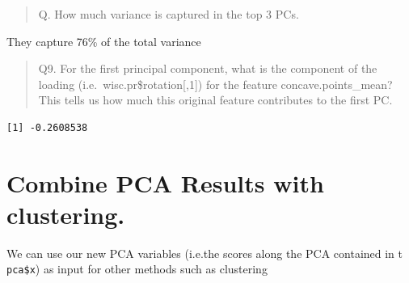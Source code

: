 \documentclass[
  letterpaper,
  DIV=11,
  numbers=noendperiod]{scrartcl}
\newenvironment{Shaded}{\begin{snugshade}}{\end{snugshade}}
\newcommand{\AttributeTok}[1]{\textcolor[rgb]{0.40,0.45,0.13}{#1}}
\newcommand{\DecValTok}[1]{\textcolor[rgb]{0.68,0.00,0.00}{#1}}
\newcommand{\FunctionTok}[1]{\textcolor[rgb]{0.28,0.35,0.67}{#1}}
\newcommand{\NormalTok}[1]{\textcolor[rgb]{0.00,0.23,0.31}{#1}}
\newcommand{\OtherTok}[1]{\textcolor[rgb]{0.00,0.23,0.31}{#1}}
\newcommand{\SpecialCharTok}[1]{\textcolor[rgb]{0.37,0.37,0.37}{#1}}
\newcommand{\StringTok}[1]{\textcolor[rgb]{0.13,0.47,0.30}{#1}}
\begin{document}
\begin{quote}
Q. How much variance is captured in the top 3 PCs.
\end{quote}

They capture 76\% of the total variance

\begin{quote}
Q9. For the first principal component, what is the component of the
loading (i.e.~wisc.pr\$rotation{[},1{]}) for the feature
concave.points\_mean? This tells us how much this original feature
contributes to the first PC.
\end{quote}

\begin{Shaded}
\end{Shaded}

\begin{verbatim}
[1] -0.2608538
\end{verbatim}

\hypertarget{combine-pca-results-with-clustering.}{%
\section{Combine PCA Results with
clustering.}\label{combine-pca-results-with-clustering.}}

We can use our new PCA variables (i.e.the scores along the PCA contained
in t \texttt{pca\$x}) as input for other methods such as clustering

\begin{Shaded}
\end{Shaded}
\end{document}
